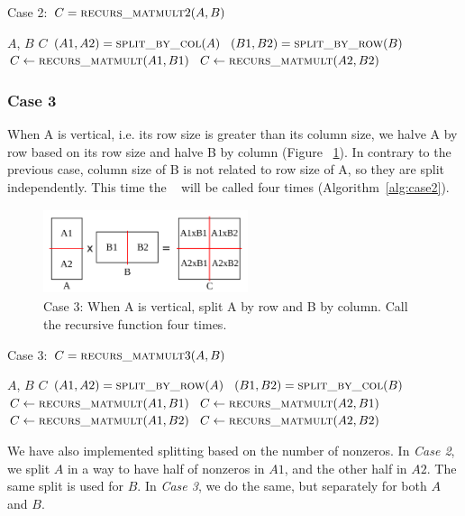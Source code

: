 \begin{algorithm}[H] 
  \caption{Case 2: $C = \textsc{recurs\_matmult}2(A, B)$} \label{alg:case2} 
  \begin{algorithmic}[1]
    \Require $A$, $B$
    \Ensure  $C$
    \State $(A1, A2) = \textsc{split\_by\_col}(A)$
    \State $(B1, B2) = \textsc{split\_by\_row}(B)$
    \State $C \leftarrow \textsc{recurs\_matmult}(A1,B1)$
    \State $C \leftarrow \textsc{recurs\_matmult}(A2,B2)$
  \end{algorithmic}
\end{algorithm}

\subsubsection{Case 3}
\label{sec:case3}
When A is vertical, i.e. its row size is greater than its column size, we halve A by row based on its row size and halve B by column (Figure ~\ref{fig:case3}). In contrary to the previous case, column size of B is not related to row size of A, so they are split independently. This time the \recmm~ will be called four times (Algorithm~\ref{alg:case2}).

\begin{figure}[tbh]
 \centering
 \includegraphics[width=6cm,height=2.5cm]{./figures/case3_001.pdf}
 \caption{Case 3: When A is vertical, split A by row and B by column. Call the recursive function four times.}
 \label{fig:case3}
\end{figure}

\begin{algorithm}[H] 
  \caption{Case 3: $C = \textsc{recurs\_matmult}3(A, B)$} \label{alg:case3} 
  \begin{algorithmic}[1]
    \Require $A$, $B$
    \Ensure  $C$
    \State $(A1, A2) = \textsc{split\_by\_row}(A)$
    \State $(B1, B2) = \textsc{split\_by\_col}(B)$
    \State $C \leftarrow \textsc{recurs\_matmult}(A1,B1)$
    \State $C \leftarrow \textsc{recurs\_matmult}(A2,B1)$
    \State $C \leftarrow \textsc{recurs\_matmult}(A1,B2)$
    \State $C \leftarrow \textsc{recurs\_matmult}(A2,B2)$
  \end{algorithmic}
\end{algorithm}

We have also implemented splitting based on the number of nonzeros. In \textit{Case 2}, we split $A$ in a way to have half of nonzeros in $A1$, and the other half in $A2$. The same split is used for $B$. In \textit{Case 3}, we do the same, but separately for both $A$ and $B$.

